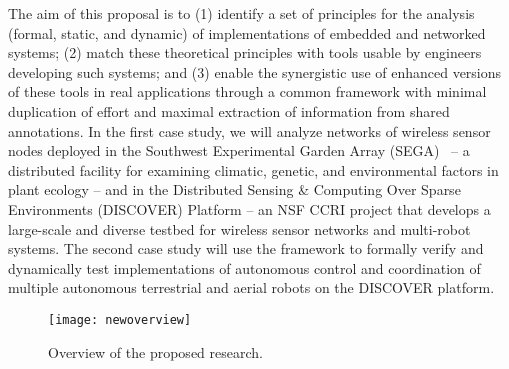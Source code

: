 
The aim of this proposal is to (1) identify a set of principles for
the analysis (formal, static, and dynamic) of implementations of
embedded and networked systems; (2) match these theoretical principles
with tools usable by engineers developing such systems; and (3) enable
the synergistic use of enhanced versions of these tools in real
applications through a common framework with minimal duplication of
effort and maximal extraction of information from shared annotations.
In the first case study, we will analyze networks of wireless sensor
nodes deployed in the Southwest Experimental Garden Array
(SEGA)~\cite{YamEtAl10,FliEtAl12} -- a distributed facility for
examining climatic, genetic, and environmental factors in plant
ecology -- and in the Distributed Sensing \& Computing Over Sparse
Environments (DISCOVER) Platform -- an NSF CCRI project that develops
a large-scale and diverse testbed for wireless sensor networks and
multi-robot systems.  The second case study will use the framework to
formally verify and dynamically test implementations of autonomous
control and coordination of multiple autonomous terrestrial and aerial
robots on the DISCOVER platform.

\begin{figure}[!t]
  \centering
  \texttt{[image: newoverview]}
  \caption{Overview of the proposed research.\vspace{-4pt}}
  \label{fig:overview}
\end{figure}

